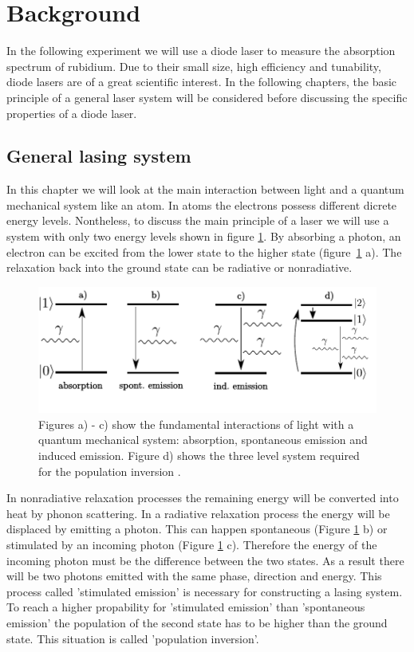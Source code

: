 \section{Background}

In the following experiment we will use a diode laser to measure the absorption
spectrum of rubidium. Due to their small size, high efficiency and tunability,
diode lasers are of a great scientific interest.
In the following chapters, the basic principle
of a general laser system will be considered before discussing the specific
properties of a diode laser.

\subsection{General lasing system}

In this chapter we will look at the main interaction between light and a
quantum mechanical system like an atom. In atoms the electrons possess different
dicrete energy levels. Nontheless, to discuss the main principle of a laser
we will use a system with only two energy levels shown in figure \ref{fig:twolevelsystem}.
By absorbing a photon, an electron can be excited from the lower state to the
higher state (figure~\ref{fig:twolevelsystem} a).
The relaxation back into the ground state can be radiative or
nonradiative.
\begin{figure}
  \centering
  \includegraphics[width = \textwidth]{Pics/energyscheme.pdf}
  \caption{Figures a) - c) show the fundamental interactions of light with a
  quantum mechanical system: absorption, spontaneous emission and induced emission.
  Figure d) shows the three level system required for the population inversion
  \cite{steven}.}%
  \label{fig:twolevelsystem}
\end{figure}
In nonradiative relaxation processes the remaining energy will be converted into
heat by phonon scattering. In a radiative relaxation process the energy will
be displaced by emitting a photon. This can happen spontaneous (Figure \ref{fig:twolevelsystem} b)
or stimulated by an incoming photon (Figure \ref{fig:twolevelsystem} c).
Therefore the energy of the incoming photon must be the difference between the
two states. As a result there will be two photons emitted with the same phase,
direction and energy. This process called 'stimulated emission' is necessary
for constructing a lasing system. To reach a higher propability for 'stimulated emission'
than 'spontaneous emission' the population of the second state has to be higher
than the ground state. This situation is called 'population inversion'.

